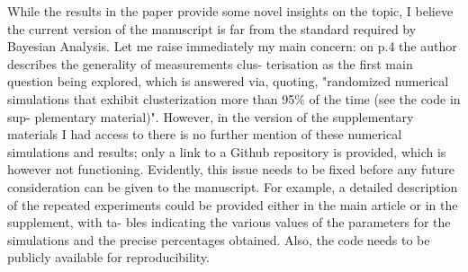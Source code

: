 \documentclass{amsart}
\begin{document}
While the results in the paper provide some novel insights on the
topic, I believe the current version of the manuscript is far from the
standard required by Bayesian Analysis. Let me raise immediately my
main concern: on p.4 the author describes the generality of
measurements clus- terisation as the first main question being
explored, which is answered via, quoting, "randomized numerical
simulations that exhibit clusterization more than 95\% of the time
(see the code in sup- plementary material)". However, in the version
of the supplementary materials I had access to there is no further
mention of these numerical simulations and results; only a link to a
Github repository is provided, which is however not
functioning. Evidently, this issue needs to be fixed before any future
consideration can be given to the manuscript. For example, a detailed
description of the repeated experiments could be provided either in
the main article or in the supplement, with ta- bles indicating the
various values of the parameters for the simulations and the precise
percentages obtained. Also, the code needs to be publicly available
for reproducibility.
\end{document}
